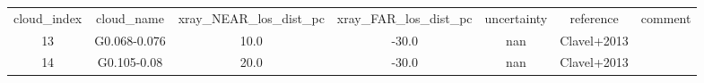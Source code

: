 \begin{table}
\begin{tabular}{ccccccc}
cloud_index & cloud_name & xray_NEAR_los_dist_pc & xray_FAR_los_dist_pc & uncertainty & reference & comment \\
13 & G0.068-0.076 & 10.0 & -30.0 & nan & Clavel+2013 &  \\
14 & G0.105-0.08 & 20.0 & -30.0 & nan & Clavel+2013 &  \\
\end{tabular}
\end{table}
